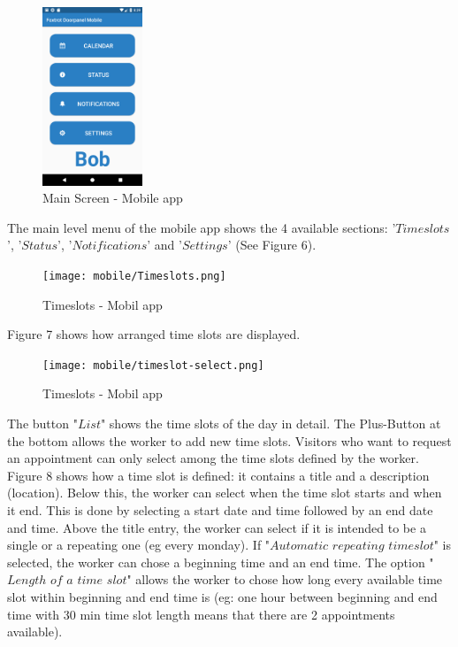\documentclass[article,colorback,accentcolor=tud4c, 11pt]{tudreport}
\begin{document}
	\begin{figure}
		\centering
		\includegraphics[width=30mm,scale=0.8]{mobile/Main-Screen.png}
		\caption{Main Screen - Mobile app}
	\end{figure}

The main level menu of the mobile app shows the 4 available sections: '$Timeslots$', '$Status$', '$Notifications$' and '$Settings$' (See Figure 6).


	\begin{figure}
		\centering
		\texttt{[image: mobile/Timeslots.png]}
		\caption{Timeslots - Mobil app}
	\end{figure}
	
Figure 7 shows how arranged time slots are displayed.\\

	\begin{figure}
		\centering
		\texttt{[image: mobile/timeslot-select.png]}
		\caption{Timeslots - Mobil app}
	\end{figure}

The button "$List$" shows the time slots of the day in detail. The Plus-Button at the bottom allows the worker to add new time slots. Visitors who want to request an appointment can only select among the time slots defined by the worker. Figure 8 shows how a time slot is defined: it contains a title and a description (location). Below this, the worker can select when the time slot starts and when it end. This is done by selecting a start date and time followed by an end date and time. Above the title entry, the worker can select if it is intended to be a single or a repeating one (eg every monday). If "$Automatic$ $repeating$ $timeslot$" is selected, the worker can chose a beginning time and an end time. The option "$Length$ $of$ $a$ $time$ $slot$" allows the worker to chose how long every available time slot within beginning and end time is (eg: one hour between beginning and end time with 30 min time slot length means that there are 2 appointments available).\\
\end{document}
